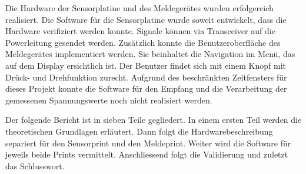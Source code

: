 Die Hardware der Sensorplatine und des Meldegerätes wurden erfolgereich realisiert. Die Software für die Sensorplatine wurde soweit entwickelt, dass die Hardware verifiziert werden konnte. Signale können via Transceiver auf die Powerleitung gesendet werden. Zusätzlich konnte die Benutzeroberfläche des Meldegerätes implementiert werden. Sie beinhaltet die Navigation im Menü, das auf dem Display ersichtlich ist. Der Benutzer findet sich mit einem Knopf mit Drück- und Drehfunktion zurecht. Aufgrund des beschränkten Zeitfensters für dieses Projekt konnte die Software für den Empfang und die Verarbeitung der gemessenen Spannungswerte noch nicht realisiert werden.

Der folgende Bericht ist in sieben Teile gegliedert. In einem ersten Teil werden die theoretischen Grundlagen erläutert. Dann folgt die Hardwarebeschreibung separiert für den Sensorprint und den Meldeprint. Weiter wird die Software für jeweils beide Prints vermittelt. Anschliessend folgt die Validierung und zuletzt das Schlusswort.